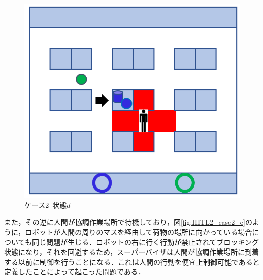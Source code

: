 \begin{figure}[!t]
    \centering
    \includegraphics[scale=0.3]{figures/HITL2_case2_d.png}
    \caption{ケース2\ 状態$d$}
    \label{fig:HITL2_case2_d}
\end{figure}


また，その逆に人間が協調作業場所で待機しており，図\ref{fig:HITL2_case2_e}のように，ロボットが人間の周りのマスを経由して荷物の場所に向かっている場合についても同じ問題が生じる．ロボットの右に行く行動が禁止されてブロッキング状態になり，それを回避するため，スーパーバイザは人間が協調作業場所に到着する以前に制御を行うことになる．これは人間の行動を便宜上制御可能であると定義したことによって起こった問題である．

